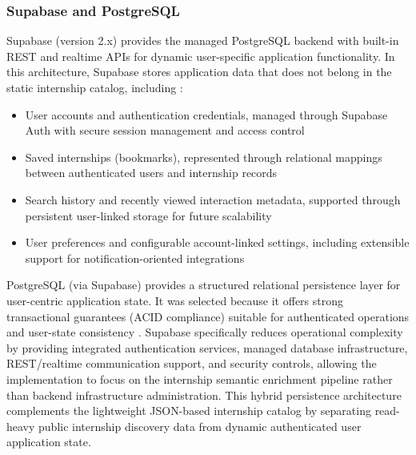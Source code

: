 \subsubsection*{Supabase and PostgreSQL}
Supabase (version 2.x) provides the managed PostgreSQL backend with built-in REST and realtime APIs for dynamic user-specific application functionality. In this architecture, Supabase stores application data that does not belong in the static internship catalog, including \cite{fielding2002principled, codd1970relational}:
\begin{itemize}
\item User accounts and authentication credentials, managed through Supabase Auth with secure session management and access control
\item Saved internships (bookmarks), represented through relational mappings between authenticated users and internship records
\item Search history and recently viewed interaction metadata, supported through persistent user-linked storage for future scalability
\item User preferences and configurable account-linked settings, including extensible support for notification-oriented integrations
\end{itemize}
PostgreSQL (via Supabase) provides a structured relational persistence layer for user-centric application state. It was selected because it offers strong transactional guarantees (ACID compliance) suitable for authenticated operations and user-state consistency \cite{codd1970relational, kleppmann2017designing}.
Supabase specifically reduces operational complexity by providing integrated authentication services, managed database infrastructure, REST/realtime communication support, and security controls, allowing the implementation to focus on the internship semantic enrichment pipeline rather than backend infrastructure administration.
This hybrid persistence architecture complements the lightweight JSON-based internship catalog by separating read-heavy public internship discovery data from dynamic authenticated user application state.
